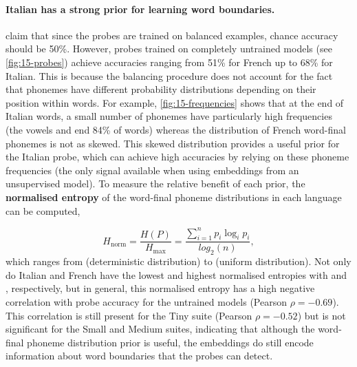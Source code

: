 
\paragraph{Italian has a strong prior for learning word boundaries.}
\citet{hahn-baroni-2019-tabula} claim that since the probes are trained on balanced examples,
chance accuracy should be 50\%. However, probes trained on completely untrained models (see \cref{fig:15-probes}) achieve accuracies ranging from 51\% for French up to 68\% for Italian. This is because the balancing procedure does not account for the fact that phonemes have different probability distributions depending on their position within words. For example, \cref{fig:15-frequencies} shows that at the end of Italian words, a small number of phonemes have particularly high frequencies (the vowels  and  end 84\% of words) whereas the distribution of French word-final phonemes is not as skewed. This skewed distribution provides a useful prior for the Italian probe, which can achieve high accuracies by relying on these phoneme frequencies (the only signal available when using embeddings from an unsupervised model). To measure the relative benefit of each prior, the \textbf{normalised entropy} of the word-final phoneme distributions in each language can be computed, 

$$H_\mathrm{norm}=\frac{H(P)}{H_\mathrm{max}} = \frac{\sum_{i=1}^np_i\log_ip_i}{log_2(n)},$$ 
which ranges from  (deterministic distribution) to  (uniform distribution). Not only do Italian and French have the lowest and highest normalised entropies with  and , respectively, but in general, this normalised entropy has a high negative correlation with probe accuracy for the untrained models (Pearson $\rho = -0.69$). This correlation is still present for the Tiny suite (Pearson $\rho = -0.52$) but is not significant for the Small and Medium suites, indicating that although the word-final phoneme distribution prior is useful, the embeddings do still encode information about word boundaries that the probes can detect.


